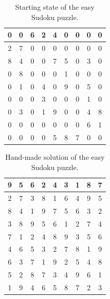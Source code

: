 \documentclass{scrartcl}
\begin{document}
\begin{table}[!htbp]
\caption{Starting state of the easy Sudoku puzzle.}
\label{tab:start}
\centering
\begin{tabularx}{5.8cm}{|c|c|c||c|c|c||c|c|c|}
\hline
0 & 0 & 6 & 2 & 4 & 0 & 0 & 0 & 0 \\
\hline
2 & 7 & 0 & 0 & 0 & 0 & 0 & 0 & 0 \\
\hline
8 & 4 & 0 & 0 & 7 & 5 & 0 & 3 & 0 \\
\hline
\hline
0 & 8 & 0 & 0 & 0 & 1 & 0 & 0 & 0 \\
\hline
0 & 1 & 0 & 4 & 0 & 9 & 0 & 5 & 0 \\
\hline
0 & 0 & 0 & 3 & 0 & 0 & 0 & 1 & 0 \\
\hline
\hline
0 & 3 & 0 & 1 & 9 & 0 & 0 & 4 & 8 \\
\hline
0 & 0 & 0 & 0 & 0 & 0 & 0 & 6 & 1 \\
\hline
0 & 0 & 0 & 0 & 5 & 8 & 7 & 0 & 0 \\
\hline
\end{tabularx}
\end{table}

\begin{table}[!htbp]
\caption{Hand-made solution of the easy Sudoku puzzle.}
\label{tab:solution}
\centering
\begin{tabularx}{5.8cm}{|c|c|c||c|c|c||c|c|c|}
\hline
9 & 5 & 6 & 2 & 4 & 3 & 1 & 8 & 7 \\
\hline
2 & 7 & 3 & 8 & 1 & 6 & 4 & 9 & 5 \\
\hline
8 & 4 & 1 & 9 & 7 & 5 & 6 & 3 & 2 \\
\hline
\hline
3 & 8 & 9 & 5 & 6 & 1 & 2 & 7 & 4 \\
\hline
7 & 1 & 2 & 4 & 8 & 9 & 3 & 5 & 6 \\
\hline
4 & 6 & 5 & 3 & 2 & 7 & 8 & 1 & 9 \\
\hline
\hline
6 & 3 & 7 & 1 & 9 & 2 & 5 & 4 & 8 \\
\hline
5 & 2 & 8 & 7 & 3 & 4 & 9 & 6 & 1 \\
\hline
1 & 9 & 4 & 6 & 5 & 8 & 7 & 2 & 3 \\
\hline
\end{tabularx}
\end{table}
\end{document}
